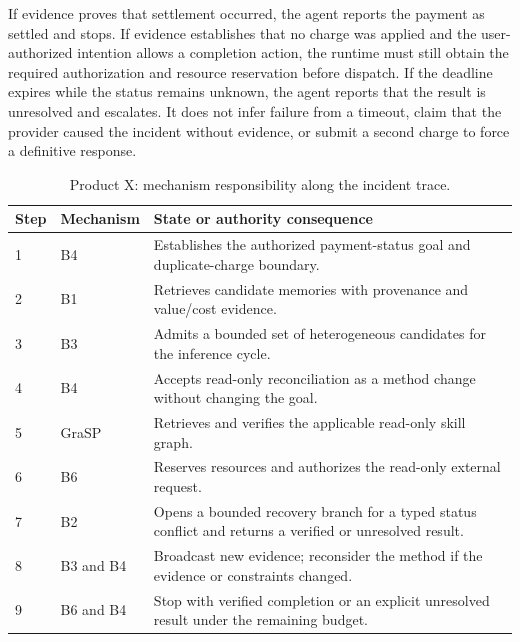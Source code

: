 If evidence proves that settlement occurred, the agent reports the payment as settled and stops. If evidence establishes that no charge was applied and the user-authorized intention allows a completion action, the runtime must still obtain the required authorization and resource reservation before dispatch. If the deadline expires while the status remains unknown, the agent reports that the result is unresolved and escalates. It does not infer failure from a timeout, claim that the provider caused the incident without evidence, or submit a second charge to force a definitive response.

\begin{table}[htbp]
\centering
\small
\caption{Product X: mechanism responsibility along the incident trace.}
\label{tab:ch18-productx-trace}
\begin{tabularx}{\linewidth}{p{1.35cm}p{3.0cm}X}
\toprule
\textbf{Step} & \textbf{Mechanism} & \textbf{State or authority consequence} \\
\midrule
1 & B4 & Establishes the authorized payment-status goal and duplicate-charge boundary. \\
2 & B1 & Retrieves candidate memories with provenance and value/cost evidence. \\
3 & B3 & Admits a bounded set of heterogeneous candidates for the inference cycle. \\
4 & B4 & Accepts read-only reconciliation as a method change without changing the goal. \\
5 & GraSP & Retrieves and verifies the applicable read-only skill graph. \\
6 & B6 & Reserves resources and authorizes the read-only external request. \\
7 & B2 & Opens a bounded recovery branch for a typed status conflict and returns a verified or unresolved result. \\
8 & B3 and B4 & Broadcast new evidence; reconsider the method if the evidence or constraints changed. \\
9 & B6 and B4 & Stop with verified completion or an explicit unresolved result under the remaining budget. \\
\bottomrule
\end{tabularx}
\end{table}


